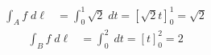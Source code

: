 \documentclass[11pt]{article}
\begin{document}
\begin{solution}   
     \begin{align*}
        \int_A f \;d\ell
        &=\int_0^1 \sqrt{2} \;dt = \left[\sqrt{2}t\right]_0^1 = \sqrt{2}
    \end{align*}
    \begin{align*}
        \int_B f \;d\ell
        &= \int_0^2 \;dt = \left[t \right]_0^2  = 2
    \end{align*}  


\end{solution}
\end{document}
